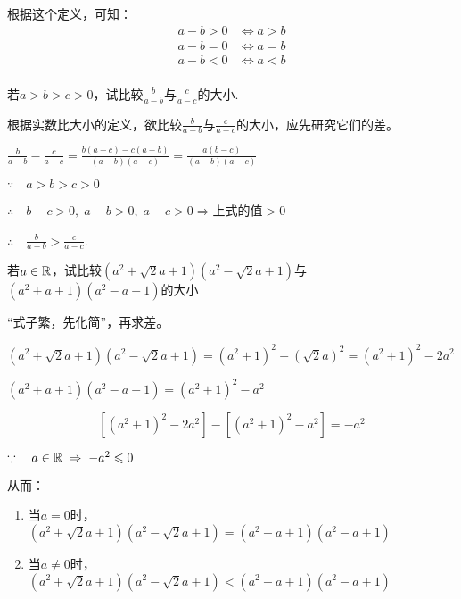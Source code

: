 根据这个定义，可知：
\[\begin{split}
    a-b>0 &\Longleftrightarrow a>b\\
    a-b=0 &\Longleftrightarrow a=b\\
    a-b<0 &\Longleftrightarrow a<b\\
\end{split}\]

\begin{example}
    若$a>b>c>0$，试比较$\frac{b}{a-b}$与$\frac{c}{a-c}$的大小.
\end{example}

\begin{analyze}
    根据实数比大小的定义，欲比较$\frac{b}{a-b}$与$\frac{c}{a-c}$的大小，应先研究它们的差。
\end{analyze}

\begin{solution}
$\frac{b}{a-b}-\frac{c}{a-c}=\frac{b(a-c)-c(a-b)}{(a-b)(a-c)}=\frac{a(b-c)}{(a-b)(a-c)}$

$\because\quad a>b>c>0$

$\therefore\quad b-c>0, \; a-b>0,\; a-c>0 \Longrightarrow $上式的值$>0$

$\therefore\quad \frac{b}{a-b}>\frac{c}{a-c}$.
\end{solution}

\begin{example}
若$a\in\mathbb{R}$，试比较$(a^2+\sqrt{2}a+1)(a^2-\sqrt{2}a+1)$与$(a^2+a+1)(a^2-a+1)$的大小
\end{example}

\begin{analyze}
    “式子繁，先化简”，再求差。
\end{analyze}

\begin{solution}
$(a^2+\sqrt{2}a+1)(a^2-\sqrt{2}a+1)=(a^2+1)^2-\left(\sqrt{2}a\right)^2=(a^2+1)^2-2a^2$

$(a^2+a+1)(a^2-a+1)=(a^2+1)^2-a^2$

\[[(a^2+1)^2-2a^2]-[(a^2+1)^2-a^2]=-a^2\]

$\because\quad a\in\mathbb{R} \;\Rightarrow\; -a^2\leqslant 0$

从而：\begin{enumerate}
    \item 当$a=0$时，$(a^2+\sqrt{2}a+1)(a^2-\sqrt{2}a+1)=(a^2+a+1)(a^2-a+1)$
    \item 当$a\ne 0$时，$(a^2+\sqrt{2}a+1)(a^2-\sqrt{2}a+1)<(a^2+a+1)(a^2-a+1)$
\end{enumerate}

\end{solution}

